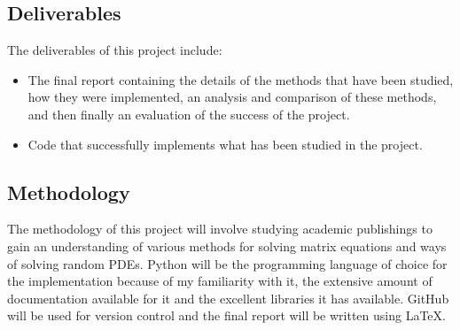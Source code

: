 \documentclass[11pt]{article}
\numberwithin{equation}{section}
\begin{document}
\subsection{Deliverables}
The deliverables of this project include:
\begin{itemize}
\item The final report containing the details of the methods that have been studied, how they were implemented, an analysis and comparison of these methods, and then finally an evaluation of the success of the project.  
\item Code that successfully implements what has been studied in the project.
\end{itemize}

\subsection{Methodology}
The methodology of this project will involve studying academic publishings to gain an understanding of various methods for solving matrix equations and ways of solving random PDEs. Python will be the programming language of choice for the implementation because of my familiarity with it, the extensive amount of documentation available for it and the excellent libraries it has available. GitHub will be used for version control and the final report will be written using \LaTeX. 

%
%
\end{document}
